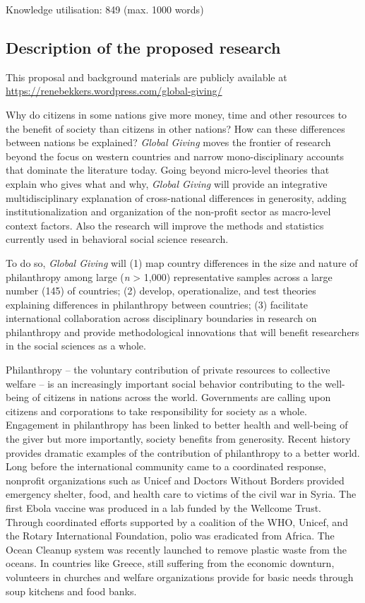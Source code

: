 \documentclass[twocolumn, serif, rga, numeric]{jote-article}
\begin{document}
\noindent Knowledge utilisation: 849 (max. 1000 words)

 {}\subsection*{Description of the proposed research} 

This proposal and background materials are publicly available at \url{https://renebekkers.wordpress.com/global-giving/}

Why do citizens in some nations give more money, time and other resources to the benefit of society than citizens in other nations? How can these differences between nations be explained? \emph{Global Giving}
moves the frontier of research beyond the focus on western countries and narrow mono-disciplinary accounts that dominate the literature today.
Going beyond micro-level theories that explain who gives what and why, \emph{Global Giving} will provide an integrative multidisciplinary explanation of cross-national differences in generosity, adding institutionalization and organization of the non-profit sector as macro-level context factors. Also the research will improve the methods and statistics currently used in behavioral social science research.

To do so, \emph{Global Giving} will (1) map country differences in the size and nature of philanthropy among large (\emph{n} \textgreater{}
1,000) representative samples across a large number (145) of countries; (2) develop, operationalize, and test theories explaining differences in philanthropy between countries; (3) facilitate international collaboration across disciplinary boundaries in research on philanthropy and provide methodological innovations that will benefit researchers in the social sciences as a whole.

Philanthropy -- the voluntary contribution of private resources to collective welfare \cite{Smith2006} -- is an increasingly important social behavior contributing to the well-being of citizens in nations across the world. Governments are calling upon citizens and corporations to take responsibility for society as a whole. Engagement in philanthropy has been linked to better health and well-being of the giver \cite{Aknin2013, DeWit2015, Dunn2008, Konrath2012} but more importantly, society benefits from generosity. Recent history provides dramatic examples of the contribution of philanthropy to a better world. Long before the international community came to a coordinated response, nonprofit organizations such as Unicef and Doctors Without Borders provided emergency shelter, food, and health care to victims of the civil war in Syria. The first Ebola vaccine was produced in a lab funded by the Wellcome Trust. Through coordinated efforts supported by a coalition of the WHO, Unicef, and the Rotary International Foundation, polio was eradicated from Africa. The Ocean Cleanup system was recently launched to remove plastic waste from the oceans. In countries like Greece, still suffering from the economic downturn, volunteers in churches and welfare organizations provide for basic needs through soup kitchens and food banks.
\end{document}
